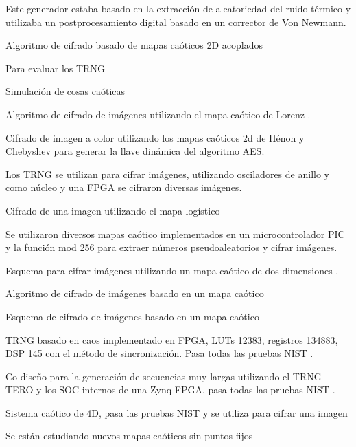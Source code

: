  Este generador estaba basado en la extracción de aleatoriedad del ruido térmico y utilizaba un postprocesamiento digital basado en un corrector de Von Newmann.


    Algoritmo de cifrado basado de mapas caóticos 2D acoplados \cite{Liu2020}

    Para evaluar los TRNG \cite{Schindler2003}

    Simulación de cosas caóticas \cite{Parker2012}

   Algoritmo de cifrado de imágenes utilizando el mapa caótico de Lorenz \cite{AlHazaimeh2017}.

   Cifrado de imagen a color utilizando los mapas caóticos 2d de Hénon y Chebyshev para generar la llave dinámica del algoritmo AES. \cite{Li2013}

    Los TRNG se utilizan para cifrar imágenes, utilizando osciladores de anillo y como núcleo y una FPGA se cifraron diversas imágenes. \cite{Sivaraman2020}

    Cifrado de una imagen utilizando el mapa logístico \cite{Pareek2006}

    Se utilizaron diversos mapas caótico implementados en un microcontrolador PIC y la función mod 256 para extraer números pseudoaleatorios y cifrar imágenes. \cite{GarciaGuerrero2020}

   Esquema para cifrar imágenes utilizando un mapa caótico de dos dimensiones \cite{Kadir2010}.

    Algoritmo de cifrado de imágenes basado en un mapa caótico \cite{Liu2016}

    Esquema de cifrado de imágenes basado en un mapa caótico \cite{Wong2008}

    TRNG basado en caos implementado en FPGA, LUTs 12383, registros 134883, DSP 145  con el método de sincronización. Pasa todas las pruebas NIST  \cite{Liao2022}.

    

    Co-diseño para la generación de secuencias muy largas utilizando el TRNG-TERO y los SOC internos de una Zynq FPGA, pasa todas las pruebas NIST \cite{HernandezMorales2022}.

    
    Sistema caótico de 4D, pasa las pruebas NIST y se utiliza para cifrar una imagen \cite{Vaidyanathan2018}

   



   Se están estudiando nuevos mapas caóticos sin puntos fijos \cite{GarciaGrimaldo2021}

   


